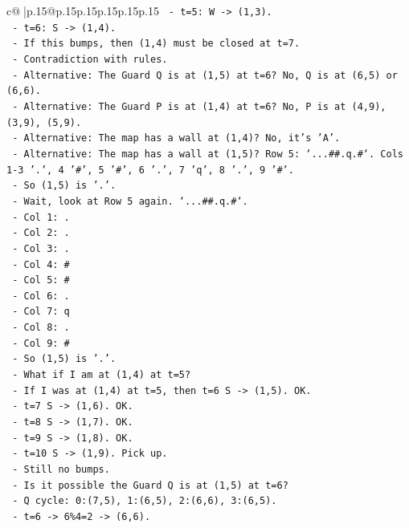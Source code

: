 \documentclass{article}
\begin{document}
{\begin{supertabular}{c@{$\;$}|p{.15\linewidth}@{}p{.15\linewidth}p{.15\linewidth}p{.15\linewidth}p{.15\linewidth}p{.15\linewidth}}
{{{\texttt{  {-} t=5: W {-}> (1,3).} \\
\texttt{  {-} t=6: S {-}> (1,4).} \\
\texttt{  {-} If this bumps, then (1,4) must be closed at t=7.} \\
\texttt{  {-} Contradiction with rules.} \\
\texttt{  {-} Alternative: The Guard Q is at (1,5) at t=6? No, Q is at (6,5) or (6,6).} \\
\texttt{  {-} Alternative: The Guard P is at (1,4) at t=6? No, P is at (4,9), (3,9), (5,9).} \\
\texttt{  {-} Alternative: The map has a wall at (1,4)? No, it's 'A'.} \\
\texttt{  {-} Alternative: The map has a wall at (1,5)? Row 5: `...\#\#.q.\#`. Cols 1{-}3 '.', 4 '\#', 5 '\#', 6 '.', 7 'q', 8 '.', 9 '\#'.} \\
\texttt{  {-} So (1,5) is '.'.} \\
\texttt{  {-} Wait, look at Row 5 again. `...\#\#.q.\#`.} \\
\texttt{  {-} Col 1: .} \\
\texttt{  {-} Col 2: .} \\
\texttt{  {-} Col 3: .} \\
\texttt{  {-} Col 4: \#} \\
\texttt{  {-} Col 5: \#} \\
\texttt{  {-} Col 6: .} \\
\texttt{  {-} Col 7: q} \\
\texttt{  {-} Col 8: .} \\
\texttt{  {-} Col 9: \#} \\
\texttt{  {-} So (1,5) is '.'.} \\
\texttt{  {-} What if I am at (1,4) at t=5?} \\
\texttt{  {-} If I was at (1,4) at t=5, then t=6 S {-}> (1,5). OK.} \\
\texttt{  {-} t=7 S {-}> (1,6). OK.} \\
\texttt{  {-} t=8 S {-}> (1,7). OK.} \\
\texttt{  {-} t=9 S {-}> (1,8). OK.} \\
\texttt{  {-} t=10 S {-}> (1,9). Pick up.} \\
\texttt{  {-} Still no bumps.} \\
\texttt{  {-} Is it possible the Guard Q is at (1,5) at t=6?} \\
\texttt{  {-} Q cycle: 0:(7,5), 1:(6,5), 2:(6,6), 3:(6,5).} \\
\texttt{  {-} t=6 {-}> 6\%4=2 {-}> (6,6).} \\
}}}
\end{supertabular}}
\end{document}
